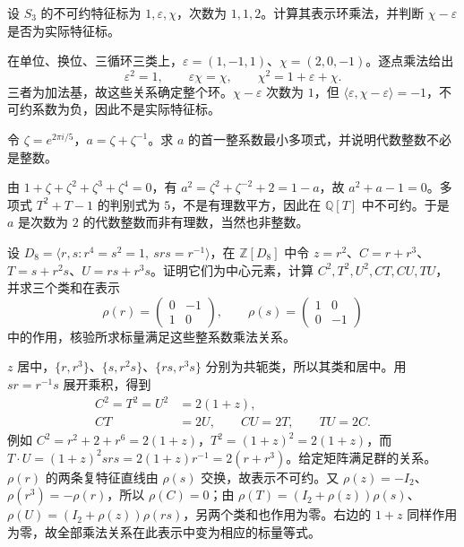 \begin{exercise}\label{b5:ex:05-s3-ring}
	设 \(S_3\) 的不可约特征标为 \(1,\varepsilon,\chi\)，次数为 \(1,1,2\)。计算其表示环乘法，并判断 \(\chi-\varepsilon\) 是否为实际特征标。
\end{exercise}
\begin{solution}
	在单位、换位、三循环三类上，\(\varepsilon=(1,-1,1)\)、\(\chi=(2,0,-1)\)。逐点乘法给出
	\[
		\varepsilon^2=1,\qquad\varepsilon\chi=\chi,\qquad \chi^2=1+\varepsilon+\chi.
	\]
	三者为加法基，故这些关系确定整个环。\(\chi-\varepsilon\) 次数为 \(1\)，但 \(\langle\varepsilon,\chi-\varepsilon\rangle=-1\)，不可约系数为负，因此不是实际特征标。
\end{solution}

\begin{exercise}\label{b5:ex:05-cyclotomic-integer}
	令 \(\zeta=e^{2\pi i/5}\)，\(a=\zeta+\zeta^{-1}\)。求 \(a\) 的首一整系数最小多项式，并说明代数整数不必是整数。
\end{exercise}
\begin{solution}
	由 \(1+\zeta+\zeta^2+\zeta^3+\zeta^4=0\)，有 \(a^2=\zeta^2+\zeta^{-2}+2=1-a\)，故 \(a^2+a-1=0\)。多项式 \(T^2+T-1\) 的判别式为 \(5\)，不是有理数平方，因此在 \(\mathbb Q[T]\) 中不可约。于是 \(a\) 是次数为 \(2\) 的代数整数而非有理数，当然也非整数。
\end{solution}

\begin{exercise}\label{b5:ex:05-class-sums-s3}
	设 \(D_8=\langle r,s:r^4=s^2=1,\ srs=r^{-1}\rangle\)，在 \(\mathbb Z[D_8]\) 中令 \(z=r^2\)、\(C=r+r^3\)、\(T=s+r^2s\)、\(U=rs+r^3s\)。证明它们为中心元素，计算 \(C^2,T^2,U^2,CT,CU,TU\)，并求三个类和在表示
	\[
		\rho(r)=\begin{pmatrix}0&-1\\1&0\end{pmatrix},\qquad
		\rho(s)=\begin{pmatrix}1&0\\0&-1\end{pmatrix}
	\]
	中的作用，核验所求标量满足这些整系数乘法关系。
\end{exercise}
\begin{solution}
	\(z\) 居中，\(\{r,r^3\}\)、\(\{s,r^2s\}\)、\(\{rs,r^3s\}\) 分别为共轭类，所以其类和居中。用 \(sr=r^{-1}s\) 展开乘积，得到
	\[
		\begin{aligned}
			C^2=T^2=U^2&=2(1+z),\\
			CT&=2U,\qquad CU=2T,\qquad TU=2C.
		\end{aligned}
	\]
	例如 \(C^2=r^2+2+r^6=2(1+z)\)，\(T^2=(1+z)^2=2(1+z)\)，而 \(T\cdot U=(1+z)^2srs=2(1+z)r^{-1}=2(r+r^3)\)。给定矩阵满足群的关系。\(\rho(r)\) 的两条复特征直线由 \(\rho(s)\) 交换，故表示不可约。又 \(\rho(z)=-I_2\)、\(\rho(r^3)=-\rho(r)\)，所以 \(\rho(C)=0\)；由 \(\rho(T)=(I_2+\rho(z))\rho(s)\)、\(\rho(U)=(I_2+\rho(z))\rho(rs)\)，另两个类和也作用为零。右边的 \(1+z\) 同样作用为零，故全部乘法关系在此表示中变为相应的标量等式。
\end{solution}

